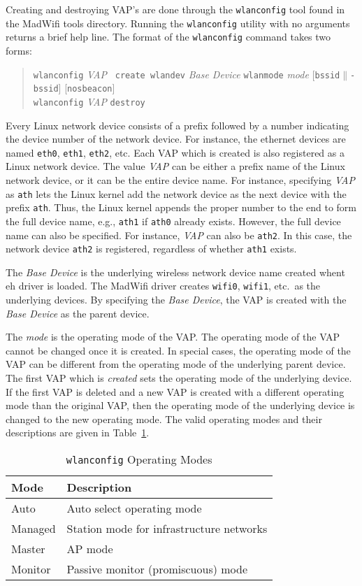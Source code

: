 \documentclass[10pt,fullpage]{article}
\newcommand{\mytt}[1]{{\texttt{#1}}}
\newcommand{\bv}{\begin{verse}}
\newcommand{\ev}{\end{verse}}
\newcommand{\clival}[1]{{\emph{#1}}}
\begin{document}
Creating and destroying VAP's are done through the \mytt{wlanconfig}
tool found in the MadWifi tools directory.  Running the
\mytt{wlanconfig} utility with no arguments returns a brief help
line.  The format of the \mytt{wlanconfig} command takes two forms:
\bv
\mytt{wlanconfig} \clival{VAP} \mytt{ create wlandev}
\clival{Base Device} \mytt{wlanmode} \clival{mode}
[\mytt{bssid}$\|$\mytt{-bssid}] [\mytt{nosbeacon}]\\
\mytt{wlanconfig} \clival{VAP} \mytt{destroy}
\ev
Every Linux network device consists of a prefix followed by a number
indicating the device number of the network device.  For instance, the
ethernet devices are named \mytt{eth0}, \mytt{eth1}, \mytt{eth2},
etc.  Each VAP which is created is also registered as a Linux network
device.  The value \clival{VAP} can be either a prefix name of the Linux
network device, or it can be the entire device name.  For instance,
specifying \clival{VAP} as \mytt{ath} lets the Linux kernel add the
network device as the next device with the prefix \mytt{ath}.  Thus,
the Linux kernel appends the proper number to the end to form the full
device name, e.g., \mytt{ath1} if \mytt{ath0} already exists.
However, the full device name can also be specified.  For instance,
\clival{VAP} can also be \mytt{ath2}.  In this case, the network
device \mytt{ath2} is registered, regardless of whether \mytt{ath1}
exists.

The \clival{Base Device} is the underlying wireless network device
name created whent eh driver is loaded.  The MadWifi driver creates
\mytt{wifi0}, \mytt{wifi1}, etc.\ as the underlying devices.  By
specifying the \clival{Base Device}, the VAP is created with the
\clival{Base Device} as the parent device.

The \clival{mode} is the operating mode of the VAP.  The operating
mode of the VAP cannot be changed once it is created.  In special
cases, the operating
mode of the VAP can be different from the operating mode of the
underlying parent device.  The first VAP which is \emph{created} sets
the operating mode of the underlying device.  If the first VAP is
deleted and a new VAP is created with a different operating mode than
the original VAP, then the operating mode of the underlying device is
changed to the new operating mode.  The valid operating modes and
their descriptions are given in Table~\ref{tab:wlanOpMode}.
\begin{table}[h*]
  \centering
  \begin{tabular}{|l|l|} \hline
    Mode & Description \\ \hline
    Auto &  Auto select operating mode \\
    Managed & Station mode for infrastructure networks\\
    Master & AP mode \\
    Monitor & Passive monitor (promiscuous) mode \\ \hline
  \end{tabular}
  \caption{\mytt{wlanconfig} Operating Modes}
  \label{tab:wlanOpMode}
\end{table}
\end{document}
